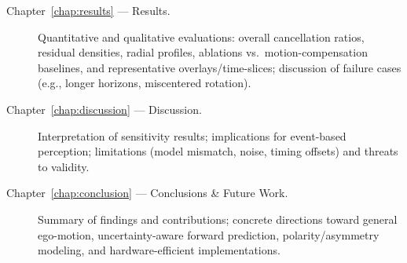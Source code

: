\begin{description}
    \item[Chapter~\ref{chap:results} --- Results.] Quantitative and qualitative evaluations: overall cancellation ratios, residual densities, radial profiles, ablations vs.\ motion-compensation baselines, and representative overlays/time-slices; discussion of failure cases (e.g., longer horizons, miscentered rotation).
    \item[Chapter~\ref{chap:discussion} --- Discussion.] Interpretation of sensitivity results; implications for event-based perception; limitations (model mismatch, noise, timing offsets) and threats to validity.
    \item[Chapter~\ref{chap:conclusion} --- Conclusions \& Future Work.] Summary of findings and contributions; concrete directions toward general ego-motion, uncertainty-aware forward prediction, polarity/asymmetry modeling, and hardware-efficient implementations.
\end{description}
